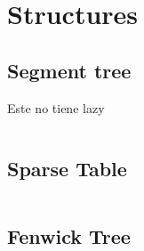 \documentclass[twoside]{article}
\begin{document}
\begin{multicols*}{2}
	\section{}
	    
	\section{Structures}
	    \subsection{Segment tree}
	    Este no tiene lazy
	    	\inputminted{cpp}{Estructuras/A.cpp}
    	\subsection{Sparse Table}
	    	\inputminted{cpp}{Estructuras/sparseTable.cpp}
    	\subsection{Fenwick Tree}
    	
\end{multicols*}
\end{document}
